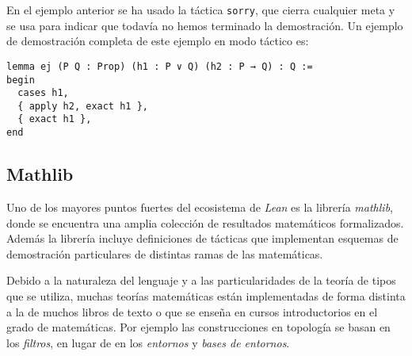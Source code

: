 En el ejemplo anterior se ha usado la táctica \lstinline{sorry}, que cierra
cualquier meta y se usa para indicar que todavía no hemos terminado la
demostración. Un ejemplo de demostración completa de este ejemplo en modo
táctico es:

\begin{lstlisting}
lemma ej (P Q : Prop) (h1 : P ∨ Q) (h2 : P → Q) : Q :=
begin
  cases h1,
  { apply h2, exact h1 },
  { exact h1 },
end
\end{lstlisting}

\subsection{Mathlib}

Uno de los mayores puntos fuertes del ecosistema de \textit{Lean} es la librería
\textit{mathlib}, donde se encuentra una amplia colección de resultados
matemáticos formalizados. Además la librería incluye definiciones de tácticas
que implementan esquemas de demostración particulares de distintas ramas de las
matemáticas.

Debido a la naturaleza del lenguaje y a las particularidades de la teoría de
tipos que se utiliza, muchas teorías matemáticas están implementadas de forma
distinta a la de muchos libros de texto o que se enseña en cursos introductorios
en el grado de matemáticas. Por ejemplo las construcciones en topología se
basan en los \textit{filtros}, en lugar de en los \textit{entornos} y
\textit{bases de entornos}.






















